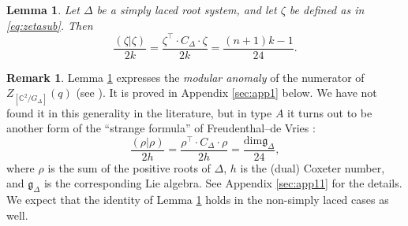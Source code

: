 \documentclass[11pt,a4paper]{amsart}
\newtheorem{lemma}[theorem]{Lemma}
\theoremstyle{definition}
\newtheorem{remark}[theorem]{Remark}
\newcommand{\SC}{\mathbb{C}}                    %
\begin{document}
\begin{lemma} Let $\Delta$ be a simply laced root system, and let $\zeta$ be defined as in \eqref{eq:zetasub}. Then
\[ \frac{(\zeta|\zeta)}{2k}=\frac{\zeta^\top \cdot C_\Delta \cdot \zeta}{2k}=\frac{(n+1)k-1}{24}. \]
\label{lem:betalength}
\end{lemma}
\begin{remark}Lemma \ref{lem:betalength} expresses the \emph{modular anomaly} of the numerator of $Z_{[\SC^2/G_\Delta]}(q)$ (see \cite[12.7.5]{kac1994infinite}). It is proved in Appendix \ref{sec:app1} below. We have not found it in this generality in the literature, but in type $A$ it turns out to be another form of the ``strange formula'' of Freudenthal--de Vries \cite{freudenthal1969linear}:
\[ \frac{(\rho|\rho)}{2h}=\frac{\rho^\top \cdot C_\Delta \cdot \rho}{2h}=\frac{\mathrm{dim} \mathfrak{g}_{\Delta}}{24}, \]
where $\rho$ is the sum of the positive roots of $\Delta$, $h$ is the (dual) Coxeter number, and $\mathfrak{g}_{\Delta}$ is the corresponding Lie algebra.
See Appendix \ref{sec:app11} for the details. We expect that the identity of Lemma \ref{lem:betalength} holds in the non-simply laced cases as well.
\end{remark}
\end{document}
